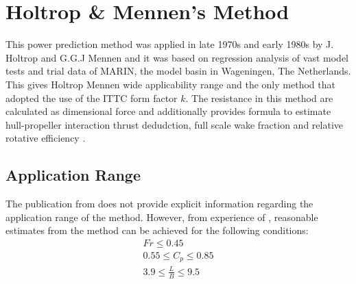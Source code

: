 \section{Holtrop \& Mennen's Method}\label{sec:foc_calc}

This power prediction method was applied in late 1970s and early 1980s by J. Holtrop and G.G.J Mennen and it was based on regression analysis of vast model tests and trial data of MARIN, the model basin in Wageningen, The Netherlands. This gives Holtrop Mennen wide applicability range and the only method that adopted the use of the ITTC form factor $k$. The resistance in this method are calculated as dimensional force and additionally provides formula to estimate hull-propeller interaction thrust dedudction, full scale wake fraction and relative rotative efficiency . 

\subsection*{Application Range}

The publication from  does not provide explicit information regarding the application range of the method. However, from experience of , reasonable estimates from the method can be achieved for the following conditions: \\

\begin{equation}
    \begin{gathered}
        Fr \leqslant 0.45 \\
        0.55 \leqslant C_p \leqslant 0.85 \\
        3.9 \leqslant \frac{L}{B} \leqslant 9.5
    \end{gathered}
\end{equation}

